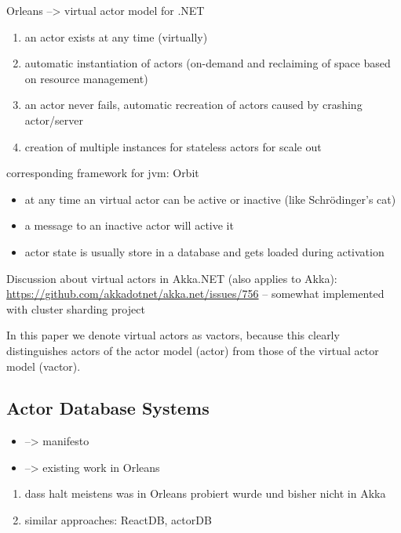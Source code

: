   Orleans --> virtual actor model for .NET \cite{bernstein:orleans}
  \begin{enumerate}
    \item an actor exists at any time (virtually)
    \item automatic instantiation of actors (on-demand and reclaiming of space based on resource management)
    \item an actor never fails, automatic recreation of actors caused by crashing actor/server
    \item creation of multiple instances for stateless actors for scale out
  \end{enumerate}

  corresponding framework for jvm: Orbit~\cite{orbit}
  \begin{itemize}
    \item at any time an virtual actor can be active or inactive (like Schrödinger's cat)
    \item a message to an inactive actor will active it
    \item actor state is usually store in a database and gets loaded during activation
  \end{itemize}

  Discussion about virtual actors in Akka.NET (also applies to Akka): \url{https://github.com/akkadotnet/akka.net/issues/756}
  -- somewhat implemented with cluster sharding project

  In this paper we denote virtual actors as vactors, because this clearly distinguishes actors of the actor model (actor) from those of the virtual actor model (vactor).


  \subsection{Actor Database Systems}

  \begin{itemize}
    \item --> manifesto
    \item --> existing work in Orleans
  \end{itemize}

\begin{enumerate}
  \item dass halt meistens was in Orleans probiert wurde und bisher nicht in Akka
  \item similar approaches: ReactDB, actorDB
\end{enumerate}